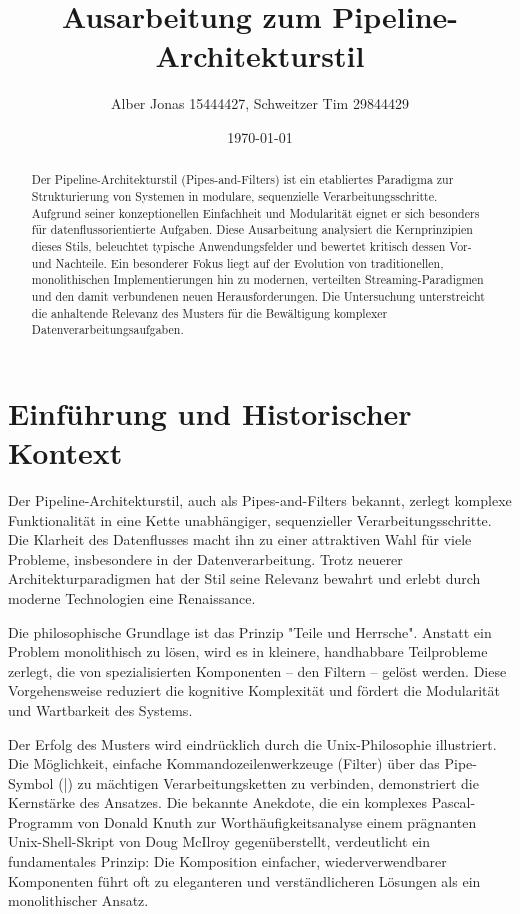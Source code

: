 \documentclass[10pt,a4paper]{article}
\title{Ausarbeitung zum Pipeline-Architekturstil}
\author{Alber Jonas 15444427, Schweitzer Tim 29844429}
\date{\today}
\begin{document}
\maketitle

\begin{abstract}
\noindent %
Der Pipeline-Architekturstil (Pipes-and-Filters) ist ein etabliertes Paradigma zur Strukturierung von Systemen in modulare, sequenzielle Verarbeitungsschritte. Aufgrund seiner konzeptionellen Einfachheit und Modularität eignet er sich besonders für datenflussorientierte Aufgaben.\cite{richards2020} Diese Ausarbeitung analysiert die Kernprinzipien dieses Stils, beleuchtet typische Anwendungsfelder und bewertet kritisch dessen Vor- und Nachteile. Ein besonderer Fokus liegt auf der Evolution von traditionellen, monolithischen Implementierungen hin zu modernen, verteilten Streaming-Paradigmen und den damit verbundenen neuen Herausforderungen. Die Untersuchung unterstreicht die anhaltende Relevanz des Musters für die Bewältigung komplexer Datenverarbeitungsaufgaben.
\end{abstract}

\section{Einführung und Historischer Kontext}
Der Pipeline-Architekturstil, auch als Pipes-and-Filters bekannt, zerlegt komplexe Funktionalität in eine Kette unabhängiger, sequenzieller Verarbeitungsschritte. Die Klarheit des Datenflusses macht ihn zu einer attraktiven Wahl für viele Probleme, insbesondere in der Datenverarbeitung. Trotz neuerer Architekturparadigmen hat der Stil seine Relevanz bewahrt und erlebt durch moderne Technologien eine Renaissance.

Die philosophische Grundlage ist das Prinzip "Teile und Herrsche". Anstatt ein Problem monolithisch zu lösen, wird es in kleinere, handhabbare Teilprobleme zerlegt, die von spezialisierten Komponenten – den Filtern – gelöst werden. Diese Vorgehensweise reduziert die kognitive Komplexität und fördert die Modularität und Wartbarkeit des Systems.\cite{richards2020}

Der Erfolg des Musters wird eindrücklich durch die Unix-Philosophie illustriert. Die Möglichkeit, einfache Kommandozeilenwerkzeuge (Filter) über das Pipe-Symbol (|) zu mächtigen Verarbeitungsketten zu verbinden, demonstriert die Kernstärke des Ansatzes.\cite{richards2020, uqcloud_pipeline} Die bekannte Anekdote, die ein komplexes Pascal-Programm von Donald Knuth zur Worthäufigkeitsanalyse einem prägnanten Unix-Shell-Skript von Doug McIlroy gegenüberstellt, verdeutlicht ein fundamentales Prinzip: Die Komposition einfacher, wiederverwendbarer Komponenten führt oft zu eleganteren und verständlicheren Lösungen als ein monolithischer Ansatz.\cite{richards2020}
\end{document}
